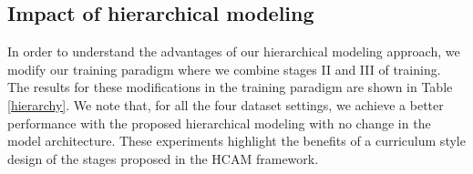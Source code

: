 \documentclass[lettersize,journal]{IEEEtran}
\begin{document}
\begin{table}[t!]
\caption{\label{tab:self-atten}Weighted F1 score of our system for the two modalities when the self-attention block is removed from the contextual GRU.}
\begin{center}
\end{center}
\end{table}
\subsection{Impact of hierarchical modeling}
In order to understand the advantages of our hierarchical modeling approach, we modify our training paradigm where we combine stages II  and III of training.  The results for these modifications in the training paradigm are shown in Table \ref{hierarchy}. We note that, for all the four dataset settings, we achieve a better performance with the proposed hierarchical modeling with no change in the model architecture. These experiments highlight the benefits of a curriculum style design of the stages proposed in the HCAM framework.
\end{document}
